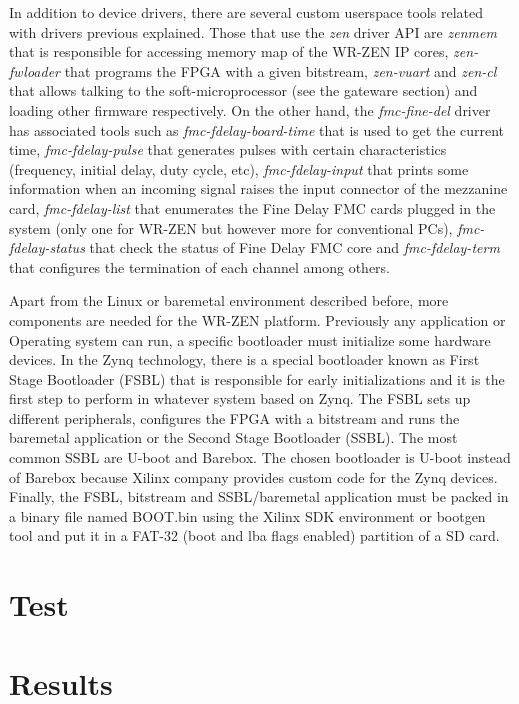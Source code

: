 \documentclass[review]{elsarticle}
\begin{document}
In addition to device drivers, there are several custom userspace tools related with drivers previous explained. Those that use the \textit{zen} driver API are \textit{zenmem} that is responsible for accessing memory map of the WR-ZEN IP cores, \textit{zen-fwloader} that programs the FPGA with a given bitstream, \textit{zen-vuart} and \textit{zen-cl} that allows talking to the soft-microprocessor (see the gateware section) and loading other firmware respectively. On the other hand, the  \textit{fmc-fine-del} driver has associated tools such as \textit{fmc-fdelay-board-time} that is used to get the current time, \textit{fmc-fdelay-pulse} that generates pulses with certain characteristics (frequency, initial delay, duty cycle, etc), \textit{fmc-fdelay-input} that prints some information when an incoming signal raises the input connector of the mezzanine card, \textit{fmc-fdelay-list} that enumerates the Fine Delay FMC cards plugged in the system (only one for WR-ZEN but however more for conventional PCs), \textit{fmc-fdelay-status} that check the status of Fine Delay FMC core and \textit{fmc-fdelay-term} that configures the termination of each channel among others.

Apart from the Linux or baremetal environment described before, more components are needed  for the WR-ZEN platform. Previously any application or Operating system can run, a specific bootloader must initialize some hardware devices. In the Zynq technology, there is a special bootloader known as First Stage Bootloader (FSBL) that is responsible for early initializations and it is the first step to perform in whatever system based on Zynq. The FSBL sets up different peripherals, configures the FPGA with a bitstream and runs the baremetal application or the Second Stage Bootloader (SSBL). The most common SSBL are U-boot and Barebox. The chosen bootloader is U-boot instead of Barebox because Xilinx company provides custom code for the Zynq devices. Finally, the FSBL, bitstream and SSBL/baremetal application must be packed in a binary file named BOOT.bin using the Xilinx SDK environment or bootgen tool and put it in a FAT-32 (boot and lba flags enabled) partition of a SD card.


\section{Test}

\section{Results}
\end{document}
